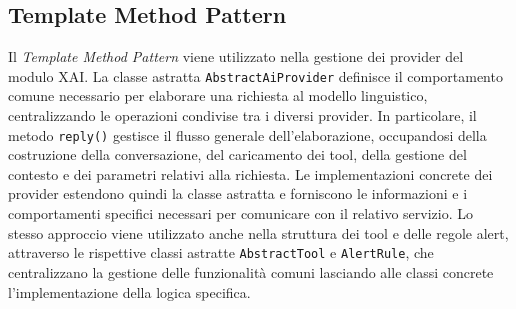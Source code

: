 \subsection{Template Method Pattern}
Il \textit{Template Method Pattern} viene utilizzato nella gestione dei provider del modulo XAI. La classe astratta \texttt{AbstractAiProvider} definisce il 
comportamento comune necessario per elaborare una richiesta al modello linguistico, centralizzando le operazioni condivise tra i diversi provider.
\newline
In particolare, il metodo \texttt{reply()} gestisce il flusso generale dell'elaborazione, occupandosi della costruzione della conversazione, del caricamento dei tool, 
della gestione del contesto e dei parametri relativi alla richiesta. Le implementazioni concrete dei provider estendono quindi la classe astratta e forniscono le informazioni e 
i comportamenti specifici necessari per comunicare con il relativo servizio.
\newline
Lo stesso approccio viene utilizzato anche nella struttura dei tool e delle regole alert, attraverso le rispettive classi astratte \texttt{AbstractTool} e \texttt{AlertRule}, 
che centralizzano la gestione delle funzionalità comuni lasciando alle classi concrete l'implementazione della logica specifica.

\newpage